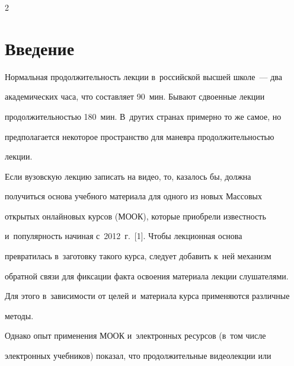




\thispagestyle{headings}





\begin{multicols}{2}





\label{st\stat}


  


\section{Введение}





  Нормальная продолжительность лекции в~российской высшей школе~--- два 


академических часа, что составляет 90~мин. Бывают сдвоенные лекции 


продолжительностью 180~мин. В~других странах примерно то же самое, но 


предполагается некоторое пространство для маневра продолжительностью 


лекции.


  


  Если вузовскую лекцию записать на видео, то, казалось бы, должна 


получиться основа учебного материала для одного из новых Массовых 


открытых онлайновых курсов (МООК), которые приобрели известность 


и~популярность начиная с~2012~г.~[1]. Чтобы лекционная основа 


превратилась в~заготовку такого курса, следует добавить к~ней механизм 


обратной связи для фиксации факта освоения материала лекции слушателями. 


Для этого в~зависимости от целей и~материала курса применяются различные 


методы.


  


  Однако опыт применения МООК и~электронных ресурсов (в~том числе 


электронных учебников) показал, что продолжительные видеолекции или 



\end{multicols}
